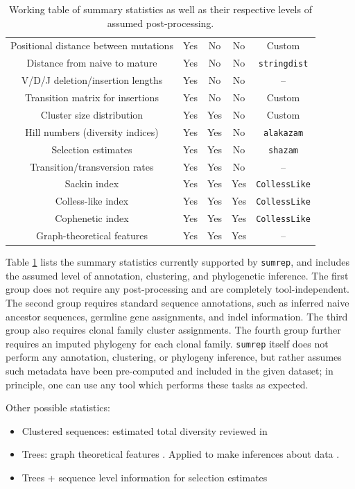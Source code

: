 \documentclass{article}
\begin{document}
\begin{table}
{\begin{tabular}{c|c|c|c|c}
Positional distance between mutations & Yes & No & No & Custom \\
Distance from naive to mature & Yes & No & No & \texttt{stringdist} \\
V/D/J deletion/insertion lengths & Yes & No & No & -- \\
Transition matrix for insertions & Yes & No & No & Custom \\
\hline
Cluster size distribution & Yes & Yes & No & Custom \\
Hill numbers (diversity indices) & Yes & Yes & No & \texttt{alakazam} \\
Selection estimates & Yes & Yes & No & \texttt{shazam} \\
Transition/transversion rates & Yes & Yes & No & -- \\
\hline
Sackin index & Yes & Yes & Yes & \texttt{CollessLike} \\
Colless-like index & Yes & Yes & Yes & \texttt{CollessLike} \\
Cophenetic index & Yes & Yes & Yes & \texttt{CollessLike} \\
Graph-theoretical features & Yes & Yes & Yes & -- \\
\end{tabular}
}
\caption{Working table of summary statistics as well as their respective levels of assumed post-processing.}
\label{tab:SummaryStatistics}
\end{table}

Table \ref{tab:SummaryStatistics} lists the summary statistics currently supported by \texttt{sumrep}, and includes the assumed level of annotation, clustering, and phylogenetic inference.
The first group does not require any post-processing and are completely tool-independent.
The second group requires standard sequence annotations, such as inferred naive ancestor sequences, germline gene assignments, and indel information.
The third group also requires clonal family cluster assignments.
The fourth group further requires an imputed phylogeny for each clonal family.
\texttt{sumrep} itself does not perform any annotation, clustering, or phylogeny inference, but rather assumes such metadata have been pre-computed and included in the given dataset; in principle, one can use any tool which performs these tasks as expected.

Other possible statistics:

\begin{itemize}
\item Clustered sequences: estimated total diversity reviewed in \cite{Mehr2012-se}
\item Trees: graph theoretical features \cite{Dunn-Walters2002-cu,Dunn-Walters2004-hv,Mehr2004-ej,Shahaf2008-cc,Budeus2015-ab,Yaari2015-ss}.
Applied to make inferences about data \cite{Steiman-Shimony2006-fm}.
\item Trees + sequence level information for selection estimates \cite{Uduman2014-pb}
\end{itemize}
\end{document}
